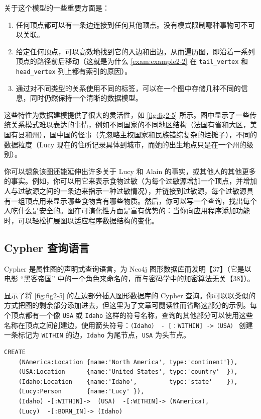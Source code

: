 关于这个模型的一些重要方面是：

\begin{enumerate}
    \item 任何顶点都可以有一条边连接到任何其他顶点。没有模式限制哪种事物可不可以关联。
    \item 给定任何顶点，可以高效地找到它的入边和出边，从而遍历图，即沿着一系列顶点的路径前后移动（这就是为什么 \autoref{exam:example2-2} 在 \texttt{tail\_vertex} 和 \texttt{head\_vertex} 列上都有索引的原因）。
    \item 通过对不同类型的关系使用不同的标签，可以在一个图中存储几种不同的信息，同时仍然保持一个清晰的数据模型。
\end{enumerate}

这些特性为数据建模提供了很大的灵活性，如 \autoref{fig:fig2-5} 所示。图中显示了一些传统关系模式难以表达的事情，例如不同国家的不同地区结构（法国有省和大区，美国有县和州），国中国的怪事（先忽略主权国家和民族错综复杂的烂摊子），不同的数据粒度（Lucy 现在的住所记录具体到城市，而她的出生地点只是在一个州的级别）。

你可以想象该图还能延伸出许多关于 Lucy 和 Alain 的事实，或其他人的其他更多的事实。例如，你可以用它来表示食物过敏（为每个过敏源增加一个顶点，并增加人与过敏源之间的一条边来指示一种过敏情况），并链接到过敏源，每个过敏源具有一组顶点用来显示哪些食物含有哪些物质。然后，你可以写一个查询，找出每个人吃什么是安全的。图在可演化性方面是富有优势的：当你向应用程序添加功能时，可以轻松扩展图以适应程序数据结构的变化。

\subsection{Cypher 查询语言}

Cypher 是属性图的声明式查询语言，为 Neo4j 图形数据库而发明【37】（它是以电影 “黑客帝国” 中的一个角色来命名的，而与密码学中的加密算法无关【38】）。

\author{exam:example2-3} 显示了将 \autoref{fig:fig2-5} 的左边部分插入图形数据库的 Cypher 查询。你可以以类似的方式把图的剩余部分添加进去，但这里为了文章可閱读性而省略这部分的示例。每个顶点都有一个像 \texttt{USA} 或 \texttt{Idaho} 这样的符号名称，查询的其他部分可以使用这些名称在顶点之间创建边，使用箭头符号：\texttt{（Idaho） - [：WITHIN] ->（USA）} 创建一条标记为 \texttt{WITHIN} 的边，\texttt{Idaho} 为尾节点，\texttt{USA} 为头节点。

\label{exam:example2-3}
\begin{lstlisting}[caption={将图 2-5 中的数据子集表示为 Cypher 查询}]
CREATE
    (NAmerica:Location {name:'North America', type:'continent'}),
    (USA:Location      {name:'United States', type:'country'  }),
    (Idaho:Location    {name:'Idaho',         type:'state'    }),
    (Lucy:Person       {name:'Lucy' }),
    (Idaho) -[:WITHIN]->  (USA)  -[:WITHIN]-> (NAmerica),
    (Lucy)  -[:BORN_IN]-> (Idaho)
\end{lstlisting}

